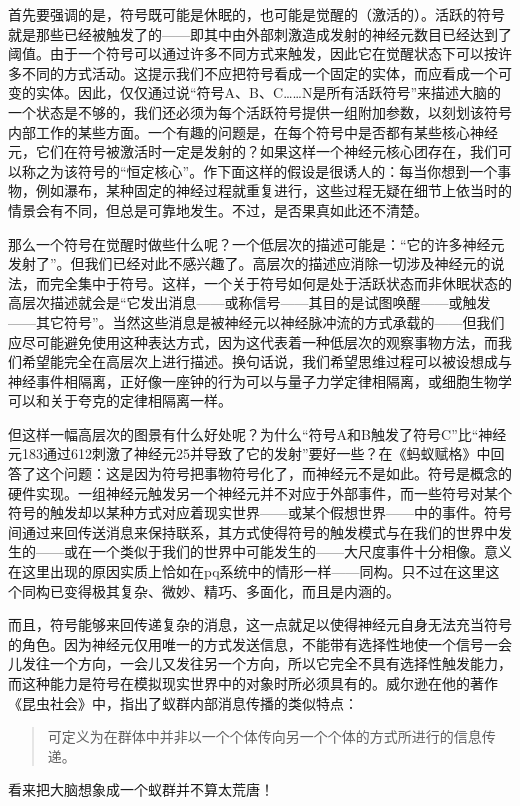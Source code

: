 首先要强调的是，符号既可能是休眠的，也可能是觉醒的（激活的）。活跃的符号就是那些已经被触发了的——即其中由外部刺激造成发射的神经元数目已经达到了阈值。由于一个符号可以通过许多不同方式来触发，因此它在觉醒状态下可以按许多不同的方式活动。这提示我们不应把符号看成一个固定的实体，而应看成一个可变的实体。因此，仅仅通过说“符号A、B、C……N是所有活跃符号”来描述大脑的一个状态是不够的，我们还必须为每个活跃符号提供一组附加参数，以刻划该符号内部工作的某些方面。一个有趣的问题是，在每个符号中是否都有某些核心神经元，它们在符号被激活时一定是发射的？如果这样一个神经元核心团存在，我们可以称之为该符号的“恒定核心”。作下面这样的假设是很诱人的：每当你想到一个事物，例如瀑布，某种固定的神经过程就重复进行，这些过程无疑在细节上依当时的情景会有不同，但总是可靠地发生。不过，是否果真如此还不清楚。

那么一个符号在觉醒时做些什么呢？一个低层次的描述可能是：“它的许多神经元发射了”。但我们已经对此不感兴趣了。高层次的描述应消除一切涉及神经元的说法，而完全集中于符号。这样，一个关于符号如何是处于活跃状态而非休眠状态的高层次描述就会是“它发出消息——或称信号——其目的是试图唤醒——或触发——其它符号”。当然这些消息是被神经元以神经脉冲流的方式承载的——但我们应尽可能避免使用这种表达方式，因为这代表着一种低层次的观察事物方法，而我们希望能完全在高层次上进行描述。换句话说，我们希望思维过程可以被设想成与神经事件相隔离，正好像一座钟的行为可以与量子力学定律相隔离，或细胞生物学可以和关于夸克的定律相隔离一样。

但这样一幅高层次的图景有什么好处呢？为什么“符号A和B触发了符号C”比“神经元183通过612刺激了神经元25并导致了它的发射”要好一些？在《蚂蚁赋格》中回答了这个问题：这是因为符号把事物符号化了，而神经元不是如此。符号是概念的硬件实现。一组神经元触发另一个神经元并不对应于外部事件，而一些符号对某个符号的触发却以某种方式对应着现实世界——或某个假想世界——中的事件。符号间通过来回传送消息来保持联系，其方式使得符号的触发模式与在我们的世界中发生的——或在一个类似于我们的世界中可能发生的——大尺度事件十分相像。意义在这里出现的原因实质上恰如在pq系统中的情形一样——同构。只不过在这里这个同构已变得极其复杂、微妙、精巧、多面化，而且是内涵的。

而且，符号能够来回传递复杂的消息，这一点就足以使得神经元自身无法充当符号的角色。因为神经元仅用唯一的方式发送信息，不能带有选择性地使一个信号一会儿发往一个方向，一会儿又发往另一个方向，所以它完全不具有选择性触发能力，而这种能力是符号在模拟现实世界中的对象时所必须具有的。威尔逊在他的著作《昆虫社会》中，指出了蚁群内部消息传播的类似特点：

\begin{quote}
可定义为在群体中并非以一个个体传向另一个个体的方式所进行的信息传递。
\end{quote}
看来把大脑想象成一个蚁群并不算太荒唐！

